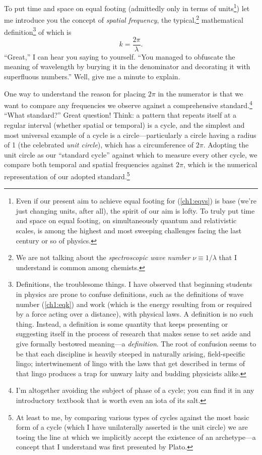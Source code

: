 To put time and space on equal footing (admittedly only in terms of
units\footnote{Even if our present aim to achieve equal footing for
  (\ref{ch1:eqvs}) is base (we're just changing units, after all), the spirit of
  our aim is lofty. To truly put time and space on equal footing, on
  simultaneously quantum and relativistic scales, is among the highest and most
  sweeping challenges facing the last century or so of physics.}) let me
introduce you the concept of \emph{spatial frequency}, the typical,\footnote{We
  are not talking about the \emph{spectroscopic wave number}
  $\nu \equiv 1 / \lambda$ that I understand is common among chemists.}
mathematical definition\footnote{Definitions, the troublesome things. I have
  observed that beginning students in physics are prone to confuse definitions,
  such as the definitions of wave number (\ref{ch1:eqk}) and work (which is the
  energy resulting from or required by a force acting over a distance), with
  physical laws. A definition is no such thing. Instead, a definition is some
  quantity that keeps presenting or suggesting itself in the process of research
  that makes sense to set aside and give formally bestowed meaning---a
  \emph{definition}. The root of confusion seems to be that each discipline is
  heavily steeped in naturally arising, field-specific lingo; intertwinement of
  lingo with the laws that get described in terms of that lingo produces a trap
  for unwary laity and budding physicists alike.} of which is
\begin{equation}
  \label{ch1:eqk}
  k = \dfrac{2 \pi}{\lambda}.
\end{equation}
``Great,'' I can hear you saying to yourself. ``You managed to obfuscate the
meaning of wavelength by burying it in the denominator and decorating it with
superfluous numbers.'' Well, give me a minute to explain.

One way to understand the reason for placing $2 \pi$ in the numerator is that we
want to compare any frequencies we observe against a comprehensive
standard.\footnote{I'm altogether avoiding the subject of phase of a cycle; you
  can find it in any introductory textbook that is worth even an iota of its
  salt.} ``What standard?'' Great question! Think: a pattern that repeats itself
at a regular interval (whether spatial or temporal) is a cycle, and the simplest
and most universal example of a cycle is a circle---particularly a circle having
a radius of 1 (the celebrated \emph{unit circle}), which has a circumference of
$2 \pi$. Adopting the unit circle as our ``standard cycle'' against which to
measure every other cycle, we compare both temporal and spatial frequencies
against $2 \pi$, which is the numerical representation of our adopted
standard.\footnote{At least to me, by comparing various types of cycles against
  the most basic form of a cycle (which I have unilaterally asserted is the unit
  circle) we are toeing the line at which we implicitly accept the existence of
  an archetype---a concept that I understand was first presented by Plato.}

